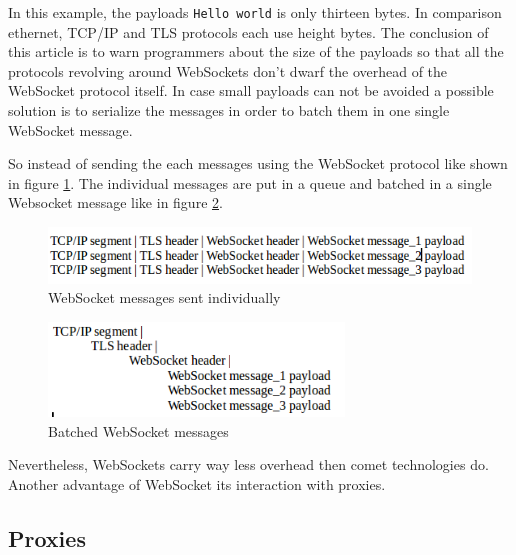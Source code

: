 In this example, the payloads \texttt{Hello world} is only thirteen bytes. In
comparison ethernet, TCP/IP and TLS protocols each use height bytes. The
conclusion of this article is to warn programmers about the size of the
payloads so that all the protocols revolving around WebSockets don't dwarf the
overhead of the WebSocket protocol itself. In case small payloads can not be
avoided a possible solution is to serialize the messages in order to batch them
in one single WebSocket message.

So instead of sending the each messages using the WebSocket protocol like shown
in figure \ref{fig:separateWebsocket}. The individual messages are put in a
queue and batched in a single Websocket message like in figure
\ref{fig:batched_websocket}.


\begin{figure}[H]
\centering
\includegraphics[width=\textwidth]{./Figures/separate_websocket.png}
\caption[Websocket messages sent individually]{WebSocket messages sent individually \citep{Reference30}}
\label{fig:separateWebsocket}
\end{figure}

\vspace{10 mm}

\begin{figure}[H]
\centering
\includegraphics[width=0.7\textwidth]{./Figures/batched_websocket.png}
\caption[Batched WebSocket messages]{Batched WebSocket messages \citep{Reference30}}
\label{fig:batched_websocket}
\end{figure}

Nevertheless, WebSockets carry way less overhead then comet technologies do.
Another advantage of WebSocket its interaction with proxies.

\subsection{Proxies}

